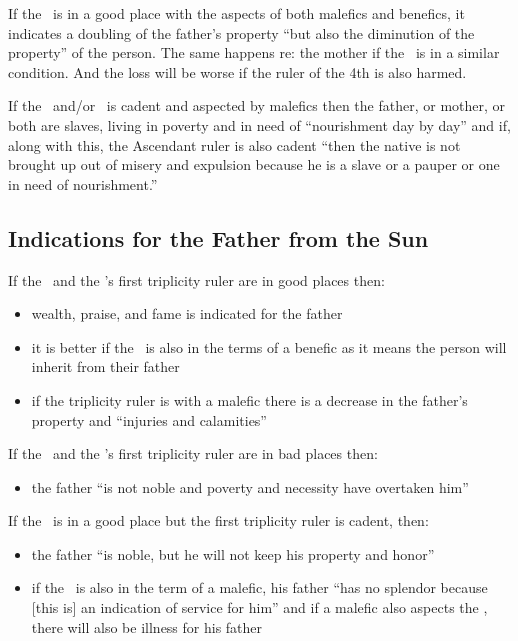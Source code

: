 If the \Sun\, is in a good place with the aspects of both malefics and benefics, it indicates a doubling of the father's property ``but also the diminution of the property'' of the person. The same happens re: the mother if the \Moon\, is in a similar condition. And the loss will be worse if the ruler of the 4th is also harmed.

If the \Sun\, and/or \Moon\, is cadent and aspected by malefics then the father, or mother, or both are slaves, living in poverty and in need of ``nourishment day by day'' and if, along with this, the Ascendant ruler is also cadent ``then the native is not brought up out of misery and expulsion because he is a slave or a pauper or one in need of nourishment.''

\subsection{Indications for the Father from the Sun}

If the \Sun\, and the \Sun's first triplicity ruler are in good places then:
\begin{itemize}[topsep=0em, itemsep=0em]
\item wealth, praise, and fame is indicated for the father
\item it is better if the \Sun\, is also in the terms of a benefic as it means the person will inherit from their father
\item if the triplicity ruler is with a malefic there is a decrease in the father's property and ``injuries and calamities''
\end{itemize}

\noindent If the \Sun\, and the \Sun's first triplicity ruler are in bad places then:
\begin{itemize}[topsep=0em, itemsep=0em]
\item the father ``is not noble and poverty and necessity have overtaken him''
\end{itemize}

\noindent If the \Sun\, is in a good place but the first triplicity ruler is cadent, then:
\begin{itemize}[topsep=0em, itemsep=0em]
\item the father ``is noble, but he will not keep his property and honor''

\item if the \Sun\, is also in the term of a malefic, his father ``has no splendor because [this is] an indication of service for him'' and if a malefic  also aspects the \Sun,  there will also be illness for his father
\end{itemize}

